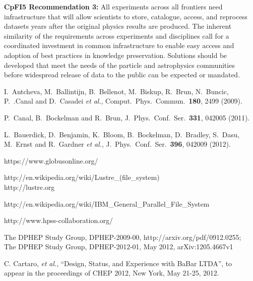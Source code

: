 {\bf CpFI5 Recommendation 3:} All experiments across all frontiers need 
infrastructure that will allow scientists to store, catalogue, access, and 
reprocess datasets years after the original physics results are produced. 
The inherent similarity of the requirements across experiments and disciplines 
call for a coordinated investment in common infrastructure to enable easy 
access and adoption of best practices in knowledge preservation.  Solutions 
should be developed that meet the needs of the particle and astrophysics 
communities before widespread release of data to the public can be expected 
or mandated.


\begin{thebibliography}{99}


  I.~Antcheva, M.~Ballintijn, B.~Bellenot, M.~Biskup, R.~Brun, N.~Buncic, P.~.Canal and D.~Casadei {\it et al.},
  Comput.\ Phys.\ Commun.\  {\bf 180}, 2499 (2009).

  P.~Canal, B.~Bockelman and R.~Brun,
  J.\ Phys.\ Conf.\ Ser.\  {\bf 331}, 042005 (2011).

  L.~Bauerdick, D.~Benjamin, K.~Bloom, B.~Bockelman, D.~Bradley, S.~Dasu, M.~Ernst and R.~Gardner {\it et al.},
  J.\ Phys.\ Conf.\ Ser.\  {\bf 396}, 042009 (2012).

  https://www.globusonline.org/

  http://en.wikipedia.org/wiki/Lustre\_(file\_system) \\
  http://lustre.org

  http://en.wikipedia.org/wiki/IBM\_General\_Parallel\_File\_System

  http://www.hpss-collaboration.org/

The DPHEP Study Group, DPHEP-2009-00, http://arxiv.org/pdf/0912.0255;\\
The DPHEP Study Group, DPHEP-2012-01, May 2012, arXiv:1205.4667v1

C. Cartaro, {\it et al.}, “Design, Status, and Experience with BaBar LTDA”, to appear in the proceedings of CHEP 2012, New York, May 21-25, 2012.


\end{thebibliography}

